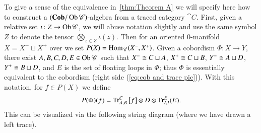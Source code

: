 \documentclass[12pt,oneside,article,draft]{memoir}
\begin{document}
To give a sense of the equivalence in~\ref{thm:Theorem A} we will specify here how to construct a $(\mathbf{Cob}/\operatorname{Ob}\mathscr{C})$-algebra from a traced category $\cat{C}$.  First, given a relative set $\iota\colon Z\to\operatorname{Ob}\mathscr{C}$, we will abuse notation slightly and use the same symbol $Z$ to denote the tensor $\bigotimes_{z\in Z}\iota(z)$.  Then for an oriented 0-manifold $X=X^-\sqcup X^+$ over we set $P(X)=\operatorname{Hom}_{\mathscr{C}}(X^-,X^+)$.  Given a cobordism $\Phi\colon X\to Y$, there exist $A,B,C,D,E\in\operatorname{Ob}\mathscr{C}$ such that $X^-\cong C\sqcup A$, $X^+\cong C\sqcup B$, $Y^-\cong A\sqcup D$, $Y^+\cong B\sqcup D$, and $E$ is the set of floating loops in $\Phi$; thus $\Phi$ is essentially equivalent to the cobordism (right side (\ref{eq:cob and trace pic})).  With this notation, for $f\in P(X)$ we define 
\begin{equation}\label{eq:cob algebra formula}
 P(\Phi)(f)=\operatorname{Tr}_{A,B}^C\big[f\big]\otimes D\otimes\operatorname{Tr}^E_{I,I}(E).
\end{equation}
This can be visualized via the following string diagram (where we have drawn a left trace).
\end{document}
